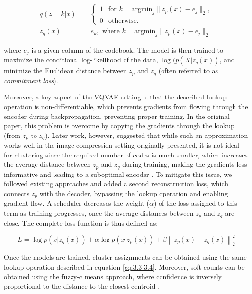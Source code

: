 \begin{align}
q(z = k|x) &= \begin{cases}
    1 & \text{for } k = \mathrm{argmin}_j\|z_p(x) - e_j\|_2, \\
    0 & \text{otherwise}.
\end{cases} \\
z_q(x) &= e_k, \text{ where } k = \mathrm{argmin}_j\|z_p(x) - e_j\|_2
\label{eq:3.3-3.4}
\end{align} 

\noindent where $e_j$ is a given column of the codebook. The model is then trained to maximize the conditional log-likelihood of the data, $\log(p(X|z_q(x))$, and minimize the Euclidean distance between $z_p$ and $z_q$ (often referred to as \textit{commitment loss}).

Moreover, a key aspect of the VQVAE setting is that the described lookup operation is non-differentiable, which prevents gradients from flowing through the encoder during backpropagation, preventing proper training. In the original paper, this problem is overcome by copying the gradients through the lookup (from $z_p$ to $z_q$). Later work, however, suggested that while such an approximation works well in the image compression setting originally presented, it is not ideal for clustering since the required number of codes is much smaller, which increases the average distance between $z_p$ and $z_q$ during training, making the gradients less informative and leading to a suboptimal encoder \cite{Fortuin2018SOM-VAE:Series}. To mitigate this issue, we followed existing approaches and added a second reconstruction loss, which connects $z_p$ with the decoder, bypassing the lookup operation and enabling gradient flow. A scheduler decreases the weight ($\alpha$) of the loss assigned to this term as training progresses, once the average distances between $z_p$ and $z_q$ are close. The complete loss function is thus defined as:

\begin{equation}
L = \log p(x|z_q(x)) + \alpha \log p(x|z_p(x)) + \beta \left\|z_p(x) - z_q(x)\right\|_2^2
\label{eq:3.5}
\end{equation}

Once the models are trained, cluster assignments can be obtained using the same lookup operation described in equation \ref{eq:3.3-3.4}. Moreover, soft counts can be obtained using the fuzzy-c means approach, where confidence is inversely proportional to the distance to the closest centroid \cite{Bezdek1984FCM:Algorithm}.

